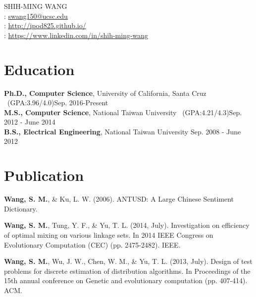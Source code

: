 \documentclass[a4paper,10pt]{article}
\begin{document}
\pagestyle{empty} %

\par{
    \center
{\Huge SHIH-MING WANG}\\
\faEnvelope: \href{mailto:swang150@ucsc.edu}{swang150@ucsc.edu} \\
\faUser: \href{http://ipod825.github.io/}{http://ipod825.github.io/}\\
\faLinkedin: \href{https://www.linkedin.com/in/shih-ming-wang-73aa3769/}{https://www.linkedin.com/in/shih-ming-wang}\\
\bigskip\par}

\section{Education}
    \textbf{Ph.D., Computer Science}, University of California, Santa Cruz \ (GPA:3.96/4.0)\hfill Sep. 2016-Present\\
    \textbf{M.S., Computer Science}, National Taiwan University \ (GPA:4.21/4.3)\hfill Sep. 2012 - June 2014 \\
    \textbf{B.S., Electrical Engineering}, National Taiwan University \hfill Sep. 2008 - June 2012

\section{Publication}
\textbf{Wang, S. M.}, \& Ku, L. W. (2006). ANTUSD: A Large Chinese Sentiment Dictionary.

\textbf{Wang, S. M.}, Tung, Y. F., \& Yu, T. L. (2014, July). Investigation on efficiency of optimal mixing on various linkage sets. In 2014 IEEE Congress on Evolutionary Computation (CEC) (pp. 2475-2482). IEEE.

\textbf{Wang, S. M.}, Wu, J. W., Chen, W. M., \& Yu, T. L. (2013, July). Design of test problems for discrete estimation of distribution algorithms. In Proceedings of the 15th annual conference on Genetic and evolutionary computation (pp. 407-414). ACM.
\end{document}
